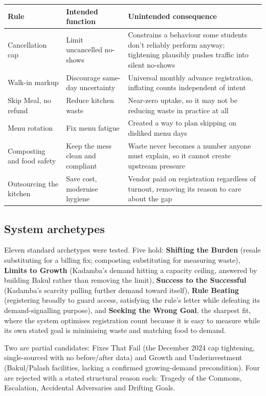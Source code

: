 \documentclass[11pt]{article}
\begin{document}
\begin{longtable}{L{0.24\textwidth}L{0.28\textwidth}L{0.42\textwidth}}
\toprule
\textbf{Rule} & \textbf{Intended function} & \textbf{Unintended consequence} \\
\midrule
\endhead
Cancellation cap & Limit uncancelled no-shows & Constrains a behaviour some students don't
reliably perform anyway; tightening plausibly pushes traffic into silent no-shows \\[4pt]
Walk-in markup & Discourage same-day uncertainty & Universal monthly advance registration,
inflating counts independent of intent \\[4pt]
Skip Meal, no refund & Reduce kitchen waste & Near-zero uptake, so it may not be reducing waste in
practice at all \\[4pt]
Menu rotation & Fix menu fatigue & Created a way to plan skipping on disliked menu days \\[4pt]
Composting and food safety & Keep the mess clean and compliant & Waste never becomes a number
anyone must explain, so it cannot create upstream pressure \\[4pt]
Outsourcing the kitchen & Save cost, modernise hygiene & Vendor paid on registration regardless of
turnout, removing its reason to care about the gap \\
\bottomrule
\end{longtable}

\subsection{System archetypes}

Eleven standard archetypes were tested. Five hold: \textbf{Shifting the Burden} (resale substituting
for a billing fix; composting substituting for measuring waste), \textbf{Limits to Growth} (Kadamba's
demand hitting a capacity ceiling, answered by building Bakul rather than removing the limit),
\textbf{Success to the Successful} (Kadamba's scarcity pulling further demand toward itself),
\textbf{Rule Beating} (registering broadly to guard access, satisfying the rule's letter while
defeating its demand-signalling purpose), and \textbf{Seeking the Wrong Goal}, the sharpest fit,
where the system optimises registration count because it is easy to measure while its own stated
goal is minimising waste and matching food to demand.

Two are partial candidates: Fixes That Fail (the December 2024 cap tightening, single-sourced with
no before/after data) and Growth and Underinvestment (Bakul/Palash facilities, lacking a confirmed
growing-demand precondition). Four are rejected with a stated structural reason each: Tragedy of the
Commons, Escalation, Accidental Adversaries and Drifting Goals.
\end{document}
